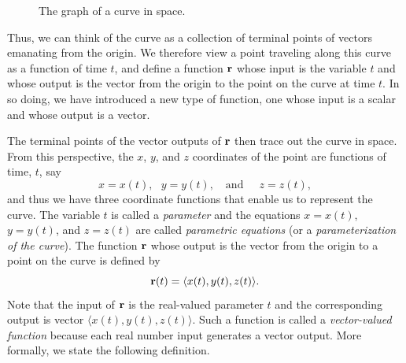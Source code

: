 \begin{figure}[ht]
\begin{center}
\caption{The graph of a curve in space.}
\label{F:9.6.VVF_graph}
\end{center}
\end{figure}



Thus, we can think of the curve as a collection of terminal points of
vectors emanating from the origin. We therefore view a point traveling
along this curve as a function of time $t$, and define a function
$\mathbf{r}$ whose input is the variable $t$ and whose output is the vector
from the origin to the point on the curve at time $t$.  In so doing,
we have introduced a new type of function, one whose input is a scalar
and whose output is a vector.

The terminal points of the vector outputs of $\mathbf{r}$ then trace out the
curve in space. From this perspective, the $x$, $y$, and $z$
coordinates of the point are functions of time, $t$, say
\[x = x(t), \ \ \ y = y(t), \ \ \ \text{ and } \ \ \ \ \ z = z(t), \]
and thus we have three coordinate functions that enable us to
represent the curve. The variable $t$ is called a \emph{parameter} and
the equations $x = x(t)$, $y = y(t)$, and $z = z(t)$ are called
\emph{parametric equations} (or a \emph{parameterization of the
  curve}). The function $\mathbf{r}$ whose output is the vector from the
origin to a point on the curve is defined by
\[\mathbf{r}(t) = \langle x(t), y(t), z(t) \rangle.\]
Note that the input of $\mathbf{r}$ is the real-valued parameter $t$ and the
corresponding output is vector $\langle x(t), y(t), z(t)
\rangle$. Such a function is called a \emph{vector-valued function}
because each real number input generates a vector output.  More
formally, we state the following definition.

